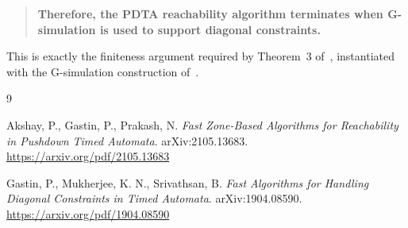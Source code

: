 \documentclass{article}
\begin{document}
\begin{quote}
\textbf{Therefore, the PDTA reachability algorithm
terminates when G-simulation is used to support diagonal constraints.}
\end{quote}

This is exactly the finiteness argument required by
Theorem~3 of~\cite{PDTA}, instantiated with the
G-simulation construction of~\cite{GAbs}.


\begin{thebibliography}{9}

Akshay, P., Gastin, P., Prakash, N.
\newblock \emph{Fast Zone-Based Algorithms for Reachability in Pushdown Timed Automata}.
\newblock arXiv:2105.13683.
\newblock \url{https://arxiv.org/pdf/2105.13683}

Gastin, P., Mukherjee, K. N., Srivathsan, B.
\newblock \emph{Fast Algorithms for Handling Diagonal Constraints in Timed Automata}.
\newblock arXiv:1904.08590.
\newblock \url{https://arxiv.org/pdf/1904.08590}

\end{thebibliography}
\end{document}
